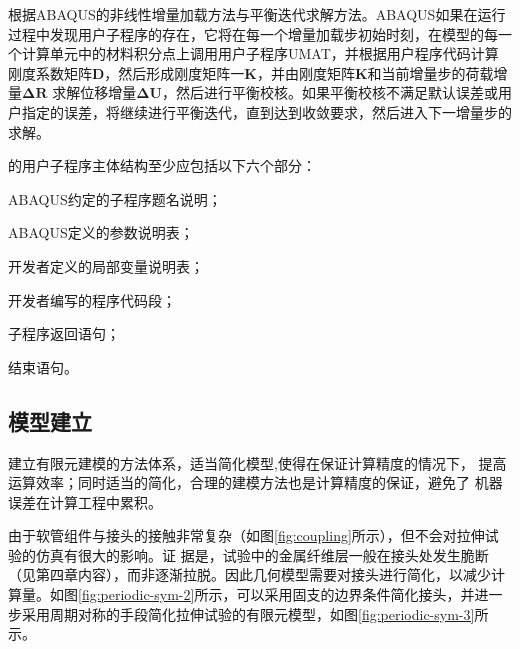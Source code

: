 根据ABAQUS的非线性增量加载方法与平衡迭代求解方法。ABAQUS如果在运行过程中发现用户子程序\uma 的存在，它将在每一个增量加载步初始时刻，在模型的每一个计算单元中的材料积分点上调用用户子程序UMAT，并根据用户程序代码计算刚度系数矩阵$ \bm{D} $，然后形成刚度矩阵一$ \bm{K} $，并由刚度矩阵$ \bm{K} $和当前增量步的荷载增量$ \bm{\Delta R} $ 求解位移增量$ \bm{\Delta U} $，然后进行平衡校核。如果平衡校核不满足默认误差或用户指定的误差，\aba 将继续进行平衡迭代，直到达到收敛要求，然后进入下一增量步的求解。

\aba 的用户子程序主体结构至少应包括以下六个部分：
\begin{inparaenum}[(1)]
\item ABAQUS约定的子程序题名说明；
\item  ABAQUS定义的参数说明表；
\item 开发者定义的局部变量说明表；
\item 开发者编写的程序代码段；
\item 子程序返回语句；
\item 结束语句。
\end{inparaenum}   


%
\subsection{模型建立}

建立有限元建模的方法体系，适当简化模型,使得在保证计算精度的情况下， 提高运算效率；同时适当的简化，合理的建模方法也是计算精度的保证，避免了 机器误差在计算工程中累积。

由于软管组件与接头的接触非常复杂（如图\ref{fig:coupling}所示），但不会对拉伸试验的仿真有很大的影响。证 据是，试验中的金属纤维层一般在接头处发生脆断（见第四章内容），而非逐渐拉脱。因此几何模型需要对接头进行简化，以减少计算量。如图\ref{fig:periodic-sym-2}所示，可以采用固支的边界条件简化接头，并进一步采用周期对称的手段简化拉伸试验的有限元模型，如图\ref{fig:periodic-sym-3}所示。


